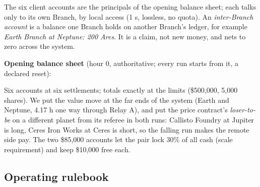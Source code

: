The six client accounts are the principals of the opening balance sheet; each talks only to its own Branch, by local access (1 s, lossless,
no quota). An \emph{inter-Branch account} is a balance one Branch holds on another Branch's ledger, for example
\emph{Earth Branch at Neptune: 200 Ares}. It is a claim, not new money, and nets to zero across the system.

\textbf{Opening balance sheet} (hour 0, authoritative; every run starts from it, a declared reset):
\begin{center}\end{center}
Six accounts at six settlements; totals exactly at the limits (\$500{,}000, 5{,}000 shares). We put the value move
at the far ends of the system (Earth and Neptune, 4.17 h one way through Relay A), and put the price contract's
\emph{loser-to-be} on a different planet from its referee in both runs: Callisto Foundry at Jupiter is long, Ceres
Iron Works at Ceres is short, so the falling run makes the remote side pay. The two \$85{,}000 accounts let the pair lock 30\% of all cash (scale requirement) and keep \$10{,}000 free each.

\subsection{Operating rulebook}

